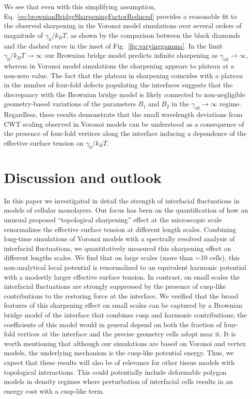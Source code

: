 \documentclass[twoside,twocolumn,9pt]{article}
\begin{document}
We see that even with this simplifying assumption, Eq.~\ref{eq:brownianBridgeSharpeningFactorReduced} provides a reasonable fit to the observed sharpening in the Voronoi model simulations over several orders of magnitude of $\gamma_{0}/{k}_{B}T$, as shown by the comparison between the black diamonds and the dashed curve in the inset of Fig.~\ref{fig:varyinggamma}. In the limit $\gamma_{0}/{k}_{B}T\rightarrow\infty$ our Brownian bridge model predicts infinite sharpening as $\gamma_{\text{eff}}\rightarrow\infty$, whereas in Voronoi model simulations the sharpening appears to plateau at a non-zero value. The fact that the plateau in sharpening coincides with a plateau in the number of four-fold defects populating the interfaces suggests that the discrepancy with the Brownian bridge model is likely connected to non-negligible geometry-based variations of the parameters $B_{1}$ and $B_{2}$ in the $\gamma_{\text{eff}}\rightarrow\infty$ regime. Regardless, these results demonstrate that the small wavelength deviations from CWT scaling observed in Voronoi models can be understood as a consequence of the presence of four-fold vertices along the interface inducing a dependence of the effective surface tension on $\gamma_{0}/k_{B}T$.






\section{Discussion and outlook}

In this paper we investigated in detail the strength of interfacial fluctuations in models of cellular monolayers. Our focus has been on the quantification of how an unusual proposed ``topological sharpening'' effect at the microscopic scale renormalizes the effective surface tension at different length scales. Combining long-time simulations of Voronoi models with a spectrally resolved analysis of interfacial fluctuations, we quantitatively measured this sharpening effect on different lengths scales. We find that on large scales (more than $\sim$10 cells), this non-analytical local potential is renormalized to an equivalent harmonic potential with a modestly larger effective surface tension. In contrast, on small scales the interfacial fluctuations are strongly suppressed by the presence of  cusp-like contributions to the restoring  force at the interface. We verified that the broad features of this sharpening effect on small scales can be captured by a Brownian bridge model of the interface that combines cusp and harmonic contributions; the coefficients of this model would in general depend on both the fraction of four-fold vertices  at  the interface and the precise geometry cells adopt near it. It is worth mentioning that although our simulations are based on Voronoi and vertex models, the underlying mechanism is the cusp-like potential energy. Thus, we expect that these results will also be of relevance for other tissue models with topological interactions. This could potentially include deformable polygon models\cite{boromand2018jamming} in density regimes where perturbation of interfacial cells results in an energy cost with a cusp-like term.  
\end{document}
